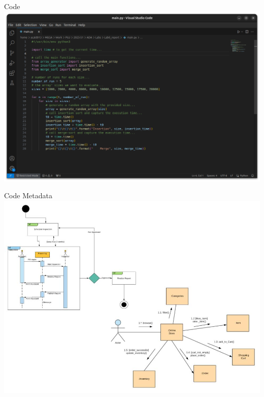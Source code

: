 \documentclass{beamer}
\begin{document}
\begin{frame}{Code}
    \centering
    \includegraphics[width=\textwidth]{figures/code}
\end{frame}
\begin{frame}{Code Metadata}
    \centering
    \includegraphics[width=\textwidth]{figures/codemeta}
\end{frame}
\end{document}
